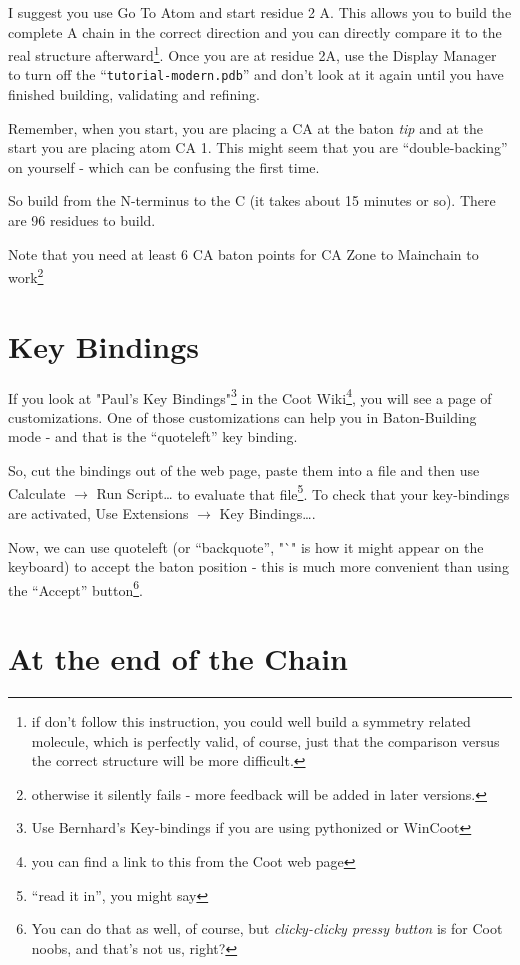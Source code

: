 \documentclass{article}
\begin{document}
I suggest you use Go To Atom and start residue 2 A. This allows you to
build the complete A chain in the correct direction and you can
directly compare it to the real structure afterward\footnote{if don't
  follow this instruction, you could well build a symmetry related
  molecule, which is perfectly valid, of course, just that the
  comparison versus the correct structure will be more difficult.}.
Once you are at residue 2A, use the Display Manager to turn off the
``{\small\texttt{tutorial-modern.pdb}}'' and don't look at it again
until you have finished building, validating and refining.
  
Remember, when you start, you are placing a CA at the baton
\emph{tip} and at the start you are placing atom CA 1.  This might
seem that you are ``double-backing'' on yourself - which can be
confusing the first time.

So build from the N-terminus to the C (it takes about 15 minutes or
so).  There are 96 residues to build.

Note that you need at least 6 CA baton points for CA Zone to Mainchain
to work\footnote{otherwise it silently fails - more feedback will be
  added in later versions.}

\section{Key Bindings}

If you look at "Paul's Key Bindings"\footnote{Use Bernhard's
  Key-bindings if you are using pythonized or WinCoot} in
the Coot Wiki\footnote{you can find a link to this from the Coot web
  page}, you will see a page of customizations.  One of those
customizations can help you in Baton-Building mode - and that is the
``quoteleft'' key binding.

So, cut the bindings out of the web page, paste them into a file and
then use \textsf{Calculate $\rightarrow$ Run Script\ldots} to evaluate
that file\footnote{``read it in'', you might say}.  To check that your
key-bindings are activated, Use \textsf{Extensions $\rightarrow$ Key
  Bindings\ldots}.

Now, we can use quoteleft (or ``backquote'', "`" is how it might
appear on the keyboard) to accept the baton position - this is much
more convenient than using the ``Accept'' button\footnote{You can do
  that as well, of course, but \emph{clicky-clicky pressy button} is for
Coot noobs, and that's not us, right?}.


\section{At the end of the Chain} 
\end{document}

